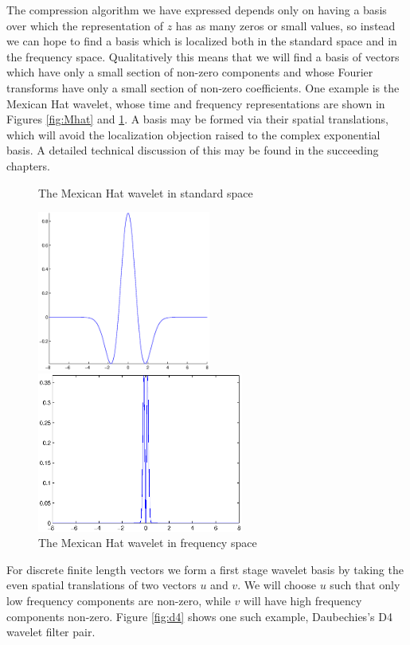 \documentclass{report}
\begin{document}
The compression algorithm we have expressed depends only on having a basis over which the representation of $z$ has as many zeros or small values, so instead we can hope to find a  basis which is localized both in the standard space and in the frequency space. Qualitatively this means that we will find a basis of vectors which have only a small section of non-zero components and whose Fourier transforms have only a small section of non-zero coefficients. One example is the Mexican Hat wavelet, whose time and frequency representations are shown in Figures \ref{fig:Mhat} and \ref{fig:fMhat}.  A basis may be formed via their spatial translations, which will avoid the localization objection raised to the complex exponential basis. A detailed technical discussion of this may be found in the succeeding chapters.

\begin{figure}
\center
\caption{The Mexican Hat wavelet in standard space}
\label{fig:Mhat}
\includegraphics[height=5.25cm]{mexhat.eps}

\caption{The Mexican Hat wavelet in frequency space}
\label{fig:fMhat}
\includegraphics[height=5.25cm]{mexhatFour.eps}
\end{figure}

For discrete finite length vectors we form a first stage wavelet basis by taking the even spatial translations of two vectors $u$ and $v$. We will choose $u$ such that only low frequency components are non-zero, while $v$ will have high frequency components non-zero. Figure \ref{fig:d4} shows one such example, Daubechies's D4 wavelet filter pair.
\end{document}
